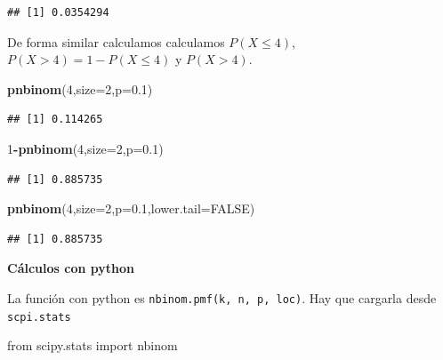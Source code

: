 \documentclass[]{book}
\newenvironment{Shaded}{\begin{snugshade}}{\end{snugshade}}
\newcommand{\DataTypeTok}[1]{\textcolor[rgb]{0.13,0.29,0.53}{#1}}
\newcommand{\DecValTok}[1]{\textcolor[rgb]{0.00,0.00,0.81}{#1}}
\newcommand{\FloatTok}[1]{\textcolor[rgb]{0.00,0.00,0.81}{#1}}
\newcommand{\ImportTok}[1]{#1}
\newcommand{\KeywordTok}[1]{\textcolor[rgb]{0.13,0.29,0.53}{\textbf{#1}}}
\newcommand{\NormalTok}[1]{#1}
\newcommand{\OperatorTok}[1]{\textcolor[rgb]{0.81,0.36,0.00}{\textbf{#1}}}
\newcommand{\OtherTok}[1]{\textcolor[rgb]{0.56,0.35,0.01}{#1}}
\begin{document}
\begin{verbatim}
## [1] 0.0354294
\end{verbatim}

De forma similar calculamos calculamos \(P(X\leq 4)\), \(P(X>4)=1-P(X\leq 4)\) y \(P(X>4)\).

\begin{Shaded}
\begin{Highlighting}[]
\KeywordTok{pnbinom}\NormalTok{(}\DecValTok{4}\NormalTok{,}\DataTypeTok{size=}\DecValTok{2}\NormalTok{,}\DataTypeTok{p=}\FloatTok{0.1}\NormalTok{)}
\end{Highlighting}
\end{Shaded}

\begin{verbatim}
## [1] 0.114265
\end{verbatim}

\begin{Shaded}
\begin{Highlighting}[]
\DecValTok{1}\OperatorTok{-}\KeywordTok{pnbinom}\NormalTok{(}\DecValTok{4}\NormalTok{,}\DataTypeTok{size=}\DecValTok{2}\NormalTok{,}\DataTypeTok{p=}\FloatTok{0.1}\NormalTok{)}
\end{Highlighting}
\end{Shaded}

\begin{verbatim}
## [1] 0.885735
\end{verbatim}

\begin{Shaded}
\begin{Highlighting}[]
\KeywordTok{pnbinom}\NormalTok{(}\DecValTok{4}\NormalTok{,}\DataTypeTok{size=}\DecValTok{2}\NormalTok{,}\DataTypeTok{p=}\FloatTok{0.1}\NormalTok{,}\DataTypeTok{lower.tail=}\OtherTok{FALSE}\NormalTok{)}
\end{Highlighting}
\end{Shaded}

\begin{verbatim}
## [1] 0.885735
\end{verbatim}

\textbf{Cálculos con python}

La función con python es \texttt{nbinom.pmf(k,\ n,\ p,\ loc)}. Hay que cargarla desde \texttt{scpi.stats}

\begin{Shaded}
\begin{Highlighting}[]
\ImportTok{from}\NormalTok{ scipy.stats }\ImportTok{import}\NormalTok{ nbinom}
\end{Highlighting}
\end{Shaded}
\end{document}
